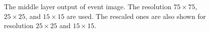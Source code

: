 \documentclass[12pt]{article}
\begin{document}
\begin{figure}[htpb]
{		}
		\caption{The middle layer output of event image. The resolution $75\times 75$, $25\times 25$, and $15\times 15$ are used. The rescaled ones are also shown for resolution $25\times 25$ and $15\times 15$.}
		\label{fig:CNN_middle_layer_output}
	\end{figure}
\end{document}
